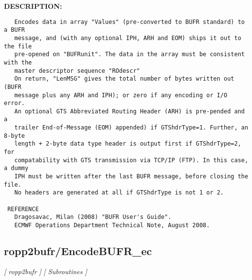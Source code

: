 \textbf{DESCRIPTION:}\hspace{0.08in}\begin{Verbatim}
   Encodes data in array "Values" (pre-converted to BUFR standard) to a BUFR
   message, and (with any optional IPH, ARH and EOM) ships it out to the file
   pre-opened on "BUFRunit". The data in the array must be consistent with the
   master descriptor sequence "ROdescr"
   On return, "LenMSG" gives the total number of bytes written out (BUFR
   message plus any ARH and IPH); or zero if any encoding or I/O error.
   An optional GTS Abbreviated Routing Header (ARH) is pre-pended and a
   trailer End-of-Message (EOM) appended) if GTShdrType=1. Further, an 8-byte
   length + 2-byte data type header is output first if GTShdrType=2, for
   compatability with GTS transmission via TCP/IP (FTP). In this case, a dummy
   IPH must be written after the last BUFR message, before closing the file.
   No headers are generated at all if GTShdrType is not 1 or 2.

 REFERENCE
   Dragosavac, Milan (2008) "BUFR User's Guide".
   ECMWF Operations Department Technical Note, August 2008.
\end{Verbatim}
\subsection{ropp2bufr/EncodeBUFR\_ec}
\textsl{[ ropp2bufr ]}
\textsl{[ Subroutines ]}

